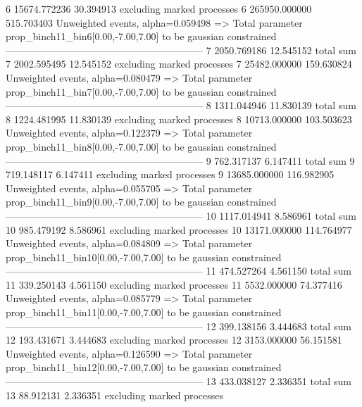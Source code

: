 6          15674.772236    30.394913       excluding marked processes    
6          265950.000000   515.703403      Unweighted events, alpha=0.059498
  => Total parameter prop_binch11_bin6[0.00,-7.00,7.00] to be gaussian constrained
------------------------------------------------------------
7          2050.769186     12.545152       total sum                     
7          2002.595495     12.545152       excluding marked processes    
7          25482.000000    159.630824      Unweighted events, alpha=0.080479
  => Total parameter prop_binch11_bin7[0.00,-7.00,7.00] to be gaussian constrained
------------------------------------------------------------
8          1311.044946     11.830139       total sum                     
8          1224.481995     11.830139       excluding marked processes    
8          10713.000000    103.503623      Unweighted events, alpha=0.122379
  => Total parameter prop_binch11_bin8[0.00,-7.00,7.00] to be gaussian constrained
------------------------------------------------------------
9          762.317137      6.147411        total sum                     
9          719.148117      6.147411        excluding marked processes    
9          13685.000000    116.982905      Unweighted events, alpha=0.055705
  => Total parameter prop_binch11_bin9[0.00,-7.00,7.00] to be gaussian constrained
------------------------------------------------------------
10         1117.014941     8.586961        total sum                     
10         985.479192      8.586961        excluding marked processes    
10         13171.000000    114.764977      Unweighted events, alpha=0.084809
  => Total parameter prop_binch11_bin10[0.00,-7.00,7.00] to be gaussian constrained
------------------------------------------------------------
11         474.527264      4.561150        total sum                     
11         339.250143      4.561150        excluding marked processes    
11         5532.000000     74.377416       Unweighted events, alpha=0.085779
  => Total parameter prop_binch11_bin11[0.00,-7.00,7.00] to be gaussian constrained
------------------------------------------------------------
12         399.138156      3.444683        total sum                     
12         193.431671      3.444683        excluding marked processes    
12         3153.000000     56.151581       Unweighted events, alpha=0.126590
  => Total parameter prop_binch11_bin12[0.00,-7.00,7.00] to be gaussian constrained
------------------------------------------------------------
13         433.038127      2.336351        total sum                     
13         88.912131       2.336351        excluding marked processes    
